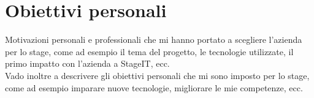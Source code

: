 \section{Obiettivi personali}
\label{sez:obiettivi-personali}
Motivazioni personali e professionali che mi hanno portato a scegliere l'azienda per lo stage, come ad esempio il tema del progetto, le tecnologie utilizzate, 
il primo impatto con l'azienda a StageIT, ecc.\\
Vado inoltre a descrivere gli obiettivi personali che mi sono imposto per lo stage, come ad esempio imparare nuove tecnologie, migliorare le mie competenze, ecc.